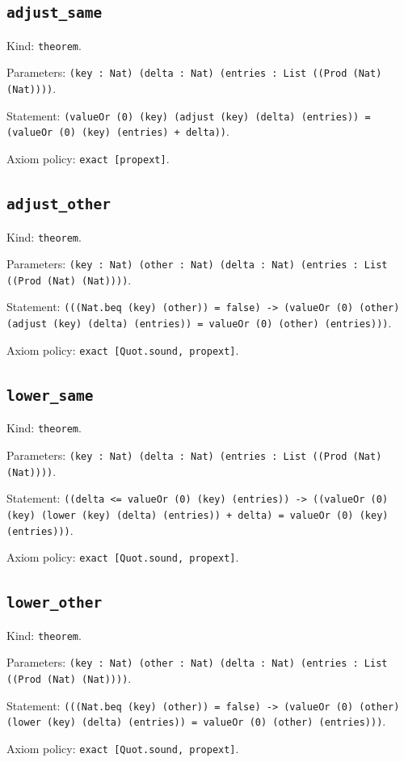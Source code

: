 \documentclass[11pt]{article}
\begin{document}
\subsection*{\texttt{adjust\_same}}
\noindent Kind: \texttt{theorem}.\par
\noindent Parameters: \texttt{(key : Nat) (delta : Nat) (entries : List ((Prod (Nat) (Nat))))}.\par
\noindent Statement: \texttt{(valueOr (0) (key) (adjust (key) (delta) (entries)) = (valueOr (0) (key) (entries) + delta))}.\par
\noindent Axiom policy: \texttt{exact [propext]}.\par
\subsection*{\texttt{adjust\_other}}
\noindent Kind: \texttt{theorem}.\par
\noindent Parameters: \texttt{(key : Nat) (other : Nat) (delta : Nat) (entries : List ((Prod (Nat) (Nat))))}.\par
\noindent Statement: \texttt{(((Nat.beq (key) (other)) = false) -> (valueOr (0) (other) (adjust (key) (delta) (entries)) = valueOr (0) (other) (entries)))}.\par
\noindent Axiom policy: \texttt{exact [Quot.sound, propext]}.\par
\subsection*{\texttt{lower\_same}}
\noindent Kind: \texttt{theorem}.\par
\noindent Parameters: \texttt{(key : Nat) (delta : Nat) (entries : List ((Prod (Nat) (Nat))))}.\par
\noindent Statement: \texttt{((delta <= valueOr (0) (key) (entries)) -> ((valueOr (0) (key) (lower (key) (delta) (entries)) + delta) = valueOr (0) (key) (entries)))}.\par
\noindent Axiom policy: \texttt{exact [Quot.sound, propext]}.\par
\subsection*{\texttt{lower\_other}}
\noindent Kind: \texttt{theorem}.\par
\noindent Parameters: \texttt{(key : Nat) (other : Nat) (delta : Nat) (entries : List ((Prod (Nat) (Nat))))}.\par
\noindent Statement: \texttt{(((Nat.beq (key) (other)) = false) -> (valueOr (0) (other) (lower (key) (delta) (entries)) = valueOr (0) (other) (entries)))}.\par
\noindent Axiom policy: \texttt{exact [Quot.sound, propext]}.\par
\end{document}
